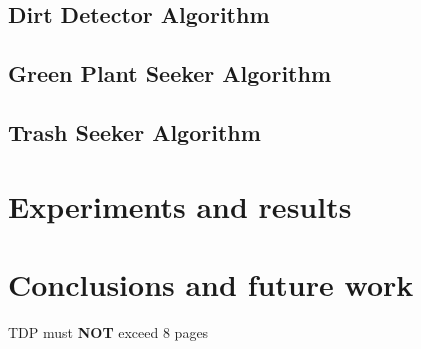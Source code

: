 \documentclass[runningheads,a4paper]{llncs}
\begin{document}
\subsection{Dirt Detector Algorithm}
\lipsum[15-17]
\subsection{Green Plant Seeker Algorithm}
\lipsum[18-20]
\subsection{Trash Seeker Algorithm}
\lipsum[20-22]

\section{Experiments and results}
\lipsum[23-24]

\section{Conclusions and future work}
\lipsum[25-26]

%
%




{\vfill\begin{center}\huge\color{red}TDP must \textbf{NOT} exceed 8 pages\end{center}}

%
%

\robospecs

\newpage

\newpage


\nocite{*}
\end{document}

